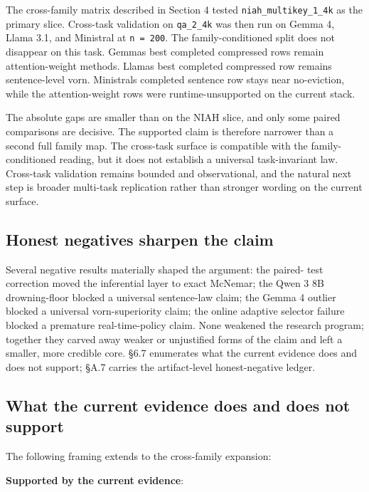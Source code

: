 \documentclass[10pt]{article}
\begin{document}
The cross-family matrix described in Section 4 tested
\texttt{niah\_multikey\_1\_4k} as the primary slice. Cross-task
validation on \texttt{qa\_2\_4k} was then run on Gemma 4, Llama 3.1, and
Ministral at \texttt{n\ =\ 200}. The family-conditioned split does
not disappear on this task. Gemma\textquotesingle s best completed
compressed rows remain attention-weight methods. Llama\textquotesingle s
best completed compressed row remains sentence-level vorn.
Ministral\textquotesingle s completed sentence row stays near
no-eviction, while the attention-weight rows were runtime-unsupported on
the current stack.

The absolute gaps are smaller than on the NIAH slice, and only some
paired comparisons are decisive. The supported claim is therefore
narrower than a second full family map. The cross-task surface is
compatible with the family-conditioned reading, but it does not
establish a universal task-invariant law. Cross-task validation remains
bounded and observational, and the natural next step is broader
multi-task replication rather than stronger wording on the current
surface.

\subsection{Honest negatives sharpen the claim}\label{66-honest-negatives-sharpen-the-claim}

Several negative results materially shaped the argument: the paired-
test correction moved the inferential layer to exact McNemar; the Qwen
3 8B drowning-floor blocked a universal sentence-law claim; the Gemma
4 outlier blocked a universal vorn-superiority claim; the online
adaptive selector failure blocked a premature real-time-policy claim.
None weakened the research program; together they carved away weaker
or unjustified forms of the claim and left a smaller, more credible
core. \S{}6.7 enumerates what the current evidence does and does not
support; \S{}A.7 carries the artifact-level honest-negative ledger.

\subsection{What the current evidence does and does not support}\label{67-what-the-current-evidence-does-and-does-not-support}

The following framing extends to the cross-family expansion:

\textbf{Supported by the current evidence}:
\end{document}
